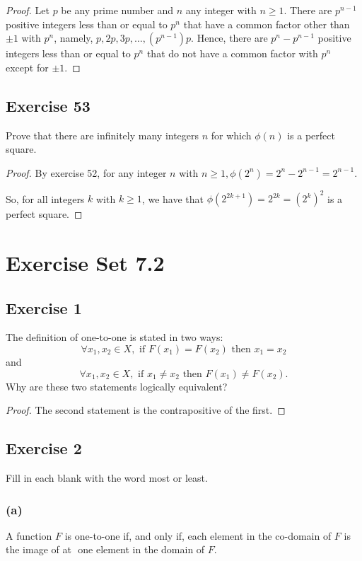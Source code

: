 \documentclass[14pt]{extarticle}
\newcommand{\fbl}{\underline{\hspace{1cm}}\,\,}
\begin{document}
\begin{proof}
Let $p$ be any prime number and $n$ any integer with \(n \geq 1\). There are \(p^{n-1}\) positive integers less than 
or equal to \(p^n\) that have a common factor other than $\pm 1$ with \(p^n\), namely, \(p, 2p, 3p, \ldots, 
(p^{n-1})p\). Hence, there are \(p^n - p^{n-1}\) positive integers less than or equal to \(p^n\) that do not have a 
common factor with \(p^n\) except for $\pm 1$.
\end{proof}

\subsection{Exercise 53}
Prove that there are infinitely many integers $n$ for which \(\phi(n)\) is a perfect square.

\begin{proof}
By exercise 52, for any integer $n$ with \(n \geq 1, \phi(2^n) = 2^n - 2^{n-1} = 2^{n-1}\).

So, for all integers $k$ with $k \geq 1$, we have that \(\phi(2^{2k+1}) = 2^{2k} = (2^k)^2\) is a perfect square.
\end{proof}

\section{Exercise Set 7.2}

\subsection{Exercise 1}
The definition of one-to-one is stated in two ways:
\[
\forall x_1, x_2 \in X, \text{ if } F(x_1) = F(x_2) \text{ then } x_1 = x_2
\]
and 
\[
\forall x_1, x_2 \in X, \text{ if } x_1 \neq x_2 \text{ then } F(x_1) \neq F(x_2).
\]
Why are these two statements logically equivalent?

\begin{proof}
The second statement is the contrapositive of the first.
\end{proof}

\subsection{Exercise 2}
Fill in each blank with the word most or least.

\subsubsection{(a)}
A function $F$ is one-to-one if, and only if, each element in the co-domain of $F$ is the image of at \fbl one element 
in the domain of $F$.
\end{document}
